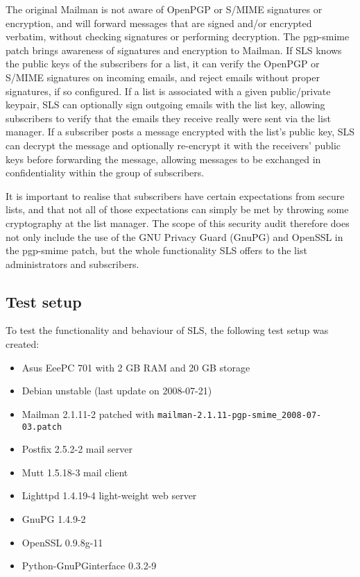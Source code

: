\documentclass[a4]{article}
\begin{document}
The original Mailman is not aware of OpenPGP or S/MIME signatures or encryption,
and will forward messages that are signed and/or encrypted verbatim,
without checking signatures or performing decryption.
The pgp-smime patch brings awareness of signatures and encryption to Mailman.
If SLS knows the public keys of the subscribers for a list,
it can verify the OpenPGP or S/MIME signatures on incoming emails,
and reject emails without proper signatures, if so configured.
If a list is associated with a given public/private keypair,
SLS can optionally sign outgoing emails with the list key,
allowing subscribers to verify that the emails they receive really were sent via the list manager.
If a subscriber posts a message encrypted with the list's public key,
SLS can decrypt the message and optionally re-encrypt it with the receivers'
public keys before forwarding the message,
allowing messages to be exchanged in confidentiality within the group of subscribers.

It is important to realise that subscribers have certain expectations from secure lists,
and that not all of those expectations can simply be met by throwing some cryptography at the list manager.
The scope of this security audit therefore does not only include the use of the GNU Privacy Guard (GnuPG) and OpenSSL in the pgp-smime patch, but the whole functionality SLS offers to the list administrators and subscribers.

\subsection{Test setup}

To test the functionality and behaviour of SLS, the following test setup was created:
\begin{itemize}
\item Asus EeePC 701 with 2 GB RAM and 20 GB storage
\item Debian unstable (last update on 2008-07-21)
\item Mailman 2.1.11-2 patched with \verb|mailman-2.1.11-pgp-smime_2008-07-03.patch|
\item Postfix 2.5.2-2 mail server
\item Mutt 1.5.18-3 mail client
\item Lighttpd 1.4.19-4 light-weight web server
\item GnuPG 1.4.9-2
\item OpenSSL 0.9.8g-11
\item Python-GnuPGinterface 0.3.2-9
\end{itemize}
\end{document}
